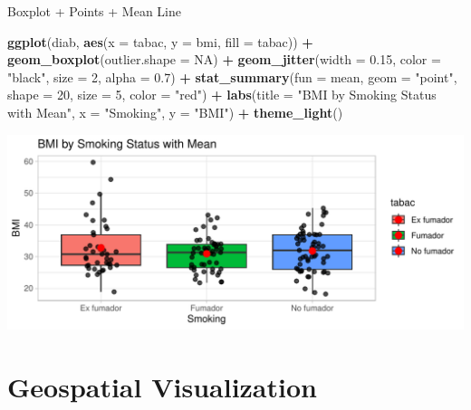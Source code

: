 \documentclass[
  ignorenonframetext,
]{beamer}
\newenvironment{Shaded}{\begin{snugshade}}{\end{snugshade}}
\newcommand{\AttributeTok}[1]{\textcolor[rgb]{0.13,0.29,0.53}{#1}}
\newcommand{\ConstantTok}[1]{\textcolor[rgb]{0.56,0.35,0.01}{#1}}
\newcommand{\DecValTok}[1]{\textcolor[rgb]{0.00,0.00,0.81}{#1}}
\newcommand{\FloatTok}[1]{\textcolor[rgb]{0.00,0.00,0.81}{#1}}
\newcommand{\FunctionTok}[1]{\textcolor[rgb]{0.13,0.29,0.53}{\textbf{#1}}}
\newcommand{\NormalTok}[1]{#1}
\newcommand{\SpecialCharTok}[1]{\textcolor[rgb]{0.81,0.36,0.00}{\textbf{#1}}}
\newcommand{\StringTok}[1]{\textcolor[rgb]{0.31,0.60,0.02}{#1}}
\begin{document}
\begin{frame}[fragile]{Boxplot + Points + Mean Line}
\label{boxplot-points-mean-line}
\begin{Shaded}
\begin{Highlighting}[]
\FunctionTok{ggplot}\NormalTok{(diab, }\FunctionTok{aes}\NormalTok{(}\AttributeTok{x =}\NormalTok{ tabac, }\AttributeTok{y =}\NormalTok{ bmi, }\AttributeTok{fill =}\NormalTok{ tabac)) }\SpecialCharTok{+}
  \FunctionTok{geom\_boxplot}\NormalTok{(}\AttributeTok{outlier.shape =} \ConstantTok{NA}\NormalTok{) }\SpecialCharTok{+}
  \FunctionTok{geom\_jitter}\NormalTok{(}\AttributeTok{width =} \FloatTok{0.15}\NormalTok{, }\AttributeTok{color =} \StringTok{"black"}\NormalTok{, }\AttributeTok{size =} \DecValTok{2}\NormalTok{, }\AttributeTok{alpha =} \FloatTok{0.7}\NormalTok{) }\SpecialCharTok{+}
  \FunctionTok{stat\_summary}\NormalTok{(}\AttributeTok{fun =}\NormalTok{ mean, }\AttributeTok{geom =} \StringTok{"point"}\NormalTok{, }\AttributeTok{shape =} \DecValTok{20}\NormalTok{, }\AttributeTok{size =} \DecValTok{5}\NormalTok{, }\AttributeTok{color =} \StringTok{"red"}\NormalTok{) }\SpecialCharTok{+}
  \FunctionTok{labs}\NormalTok{(}\AttributeTok{title =} \StringTok{"BMI by Smoking Status with Mean"}\NormalTok{, }\AttributeTok{x =} \StringTok{"Smoking"}\NormalTok{, }\AttributeTok{y =} \StringTok{"BMI"}\NormalTok{) }\SpecialCharTok{+}
  \FunctionTok{theme\_light}\NormalTok{()}
\end{Highlighting}
\end{Shaded}

\includegraphics{StatisticsWithR-3-Exploratory_Analysis_II_And_Graphics_files/figure-beamer/unnamed-chunk-32-1.pdf}
\end{frame}

\section{Geospatial Visualization}\label{geospatial-visualization}
\end{document}
